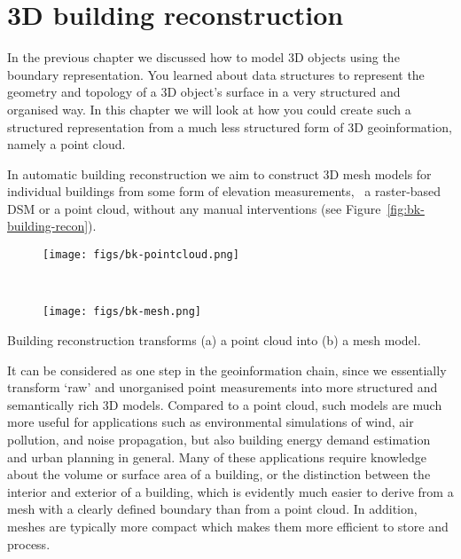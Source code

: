 
\setchapterpreamble[u]{\margintoc}

\graphicspath{{LoD2recon/}}

\chapter{3D building reconstruction}%
\label{chap:LoD2recon}

In the previous chapter we discussed how to model 3D objects using the boundary representation.
You learned about data structures to represent the geometry and topology of a 3D object's surface in a very structured and organised way.
In this chapter we will look at how you could create such a structured representation from a much less structured form of 3D geoinformation, namely a point cloud.

In automatic building reconstruction we aim to construct 3D mesh models for individual buildings from some form of elevation measurements, \ie\ a raster-based DSM or a point cloud, without any manual interventions (see Figure~\ref{fig:bk-building-recon}).
\begin{marginfigure}
	\centering
	\begin{subfigure}{\linewidth}
		\texttt{[image: figs/bk-pointcloud.png]}
		\caption{}%
		\label{subfig:bk-pc}
	\end{subfigure}
\\
	\begin{subfigure}{\linewidth}
		\texttt{[image: figs/bk-mesh.png]}
		\caption{}%
		\label{subfig:bk-mesh}
	\end{subfigure}
	\caption[Building reconstruction transforms a point cloud into a mesh model]{Building reconstruction transforms (a) a point cloud into (b) a mesh model.}%
	\label{fig:bk-building-recon}
\end{marginfigure}
It can be considered as one step in the geoinformation chain, since we essentially transform `raw' and unorganised point measurements into more structured and semantically rich 3D models.
Compared to a point cloud, such models are much more useful for applications such as environmental simulations of wind, air pollution, and noise propagation, but also building energy demand estimation and urban planning in general.
Many of these applications require knowledge about the volume or surface area of a building, or the distinction between the interior and exterior of a building, which is evidently much easier to derive from a mesh with a clearly defined boundary than from a point cloud.
In addition, meshes are typically more compact which makes them more efficient to store and process.

